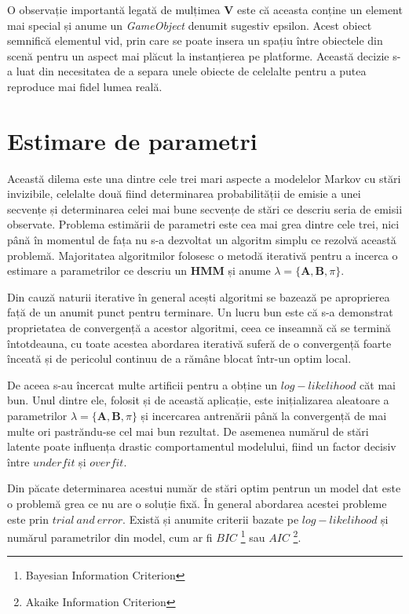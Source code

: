 O observație importantă legată de mulțimea \textbf{V} este că aceasta conține un element mai special și anume un \textit{GameObject} denumit sugestiv epsilon. Acest obiect semnifică elementul vid, prin care se poate insera un spațiu între obiectele din scenă pentru un aspect mai plăcut la instanțierea pe platforme. Această decizie s-a luat din necesitatea de a separa unele obiecte de celelalte pentru a putea reproduce mai fidel lumea reală.\par

\section{Estimare de parametri}

Această dilema este una dintre cele trei mari aspecte a modelelor Markov cu stări invizibile, celelalte două fiind determinarea probabilității de emisie a unei secvențe și determinarea celei mai bune secvențe de stări ce descriu seria de emisii observate. Problema estimării de parametri este cea mai grea dintre cele trei, nici până în momentul de fața nu s-a dezvoltat un algoritm simplu ce rezolvă această problemă. Majoritatea algoritmilor folosesc o metodă iterativă pentru a incerca o estimare a parametrilor ce descriu un \textbf{HMM} și anume $\lambda = \{\textbf{A},\textbf{B},\pi\}$.\par

Din cauză naturii iterative în general acești algoritmi se bazează pe aproprierea față de un anumit punct pentru terminare. Un lucru bun este că s-a demonstrat proprietatea de convergență a acestor algoritmi, ceea ce inseamnă că se termină întotdeauna, cu toate acestea abordarea iterativă suferă de o convergență foarte înceată și de pericolul continuu de a rămâne blocat într-un optim local.\par

De aceea s-au încercat multe artificii pentru a obține un $log-likelihood$ căt mai bun. Unul dintre ele, folosit și de această aplicație, este inițializarea aleatoare a parametrilor $\lambda = \{\textbf{A},\textbf{B},\pi\}$ și incercarea antrenării până la convergență de mai multe ori pastrăndu-se cel mai bun rezultat. De asemenea numărul de stări latente poate influența drastic comportamentul modelului, fiind un factor decisiv între $underfit$ și $overfit$.\par

Din păcate determinarea acestui număr de stări optim pentrun un model dat este o problemă grea ce nu are o soluție fixă. În general abordarea acestei probleme este prin $trial\ and\ error$. Există și anumite criterii bazate pe $log-likelihood$ și numărul parametrilor din model, cum ar fi $BIC$ \footnote{Bayesian Information Criterion} sau $AIC$ \footnote{Akaike Information Criterion}.\par

